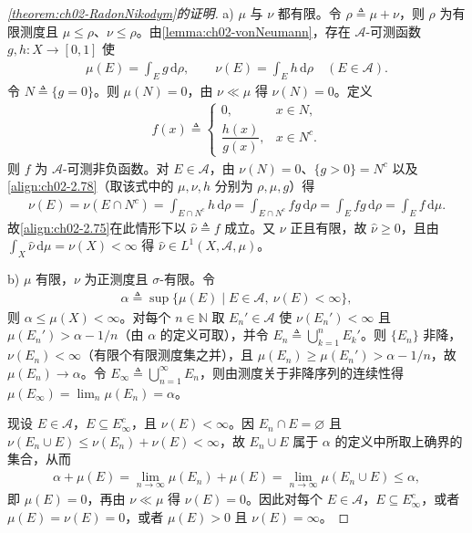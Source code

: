 \documentclass[../../main.tex]{subfiles}%
\begin{document}
\begin{proof}[\cref{theorem:ch02-RadonNikodym}的证明]
a) $\mu$ 与 $\nu$ 都有限。令 $\rho\triangleq\mu+\nu$，则 $\rho$ 为有限测度且 $\mu\leqslant\rho$、$\nu\leqslant\rho$。由\cref{lemma:ch02-vonNeumann}，存在 $\mathscr A$-可测函数 $g,h:X\to[0,1]$ 使
\begin{align*}
\mu(E)=\int_Eg\,\mathrm{d}\rho,\qquad\nu(E)=\int_Eh\,\mathrm{d}\rho\quad(E\in\mathscr A).
\end{align*}
令 $N\triangleq\{g=0\}$。则 $\mu(N)=0$，由 $\nu\ll\mu$ 得 $\nu(N)=0$。定义
\begin{align*}
f(x)\triangleq
\begin{cases}
0, & x\in N,\\[1mm]
\dfrac{h(x)}{g(x)}, & x\in N^c.
\end{cases}
\end{align*}
则 $f$ 为 $\mathscr A$-可测非负函数。对 $E\in\mathscr A$，由 $\nu(N)=0$、$\{g>0\}=N^c$ 以及\eqref{align:ch02-2.78}（取该式中的 $\mu,\nu,h$ 分别为 $\rho,\mu,g$）得
\begin{align*}
\nu(E)=\nu(E\cap N^c)=\int_{E\cap N^c}h\,\mathrm{d}\rho=\int_{E\cap N^c}fg\,\mathrm{d}\rho=\int_Efg\,\mathrm{d}\rho=\int_Ef\,\mathrm{d}\mu.
\end{align*}
故\eqref{align:ch02-2.75}在此情形下以 $\hat\nu\triangleq f$ 成立。又 $\nu$ 正且有限，故 $\hat\nu\geqslant0$，且由 $\int_X\hat\nu\,\mathrm{d}\mu=\nu(X)<\infty$ 得 $\hat\nu\in L^1(X,\mathscr A,\mu)$。

b) $\mu$ 有限，$\nu$ 为正测度且 $\sigma$-有限。令
\begin{align*}
\alpha\triangleq\sup\{\mu(E)\mid E\in\mathscr A,\ \nu(E)<\infty\},
\end{align*}
则 $\alpha\leqslant\mu(X)<\infty$。对每个 $n\in\mathbb N$ 取 $E_n'\in\mathscr A$ 使 $\nu(E_n')<\infty$ 且 $\mu(E_n')>\alpha-1/n$（由 $\alpha$ 的定义可取），并令 $E_n\triangleq\bigcup_{k=1}^nE_k'$。则 $\{E_n\}$ 非降，$\nu(E_n)<\infty$（有限个有限测度集之并），且 $\mu(E_n)\geqslant\mu(E_n')>\alpha-1/n$，故 $\mu(E_n)\to\alpha$。令 $E_\infty\triangleq\bigcup_{n=1}^\infty E_n$，则由测度关于非降序列的连续性得 $\mu(E_\infty)=\lim_n\mu(E_n)=\alpha$。

现设 $E\in\mathscr A$，$E\subseteq E_\infty^c$，且 $\nu(E)<\infty$。因 $E_n\cap E=\varnothing$ 且 $\nu(E_n\cup E)\leqslant\nu(E_n)+\nu(E)<\infty$，故 $E_n\cup E$ 属于 $\alpha$ 的定义中所取上确界的集合，从而
\begin{align*}
\alpha+\mu(E)=\lim_{n\to\infty}\mu(E_n)+\mu(E)=\lim_{n\to\infty}\mu(E_n\cup E)\leqslant\alpha,
\end{align*}
即 $\mu(E)=0$，再由 $\nu\ll\mu$ 得 $\nu(E)=0$。因此对每个 $E\in\mathscr A$，$E\subseteq E_\infty^c$，或者 $\mu(E)=\nu(E)=0$，或者 $\mu(E)>0$ 且 $\nu(E)=\infty$。


\end{proof}
\end{document}
